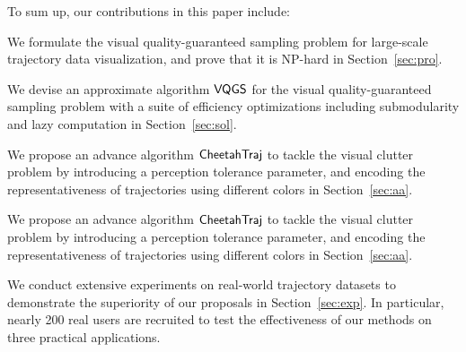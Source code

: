 To sum up, our contributions in this paper include:
\squishlist
  \item We formulate the visual quality-guaranteed sampling problem for large-scale trajectory data visualization, and prove that it is {NP-hard} in Section~\ref{sec:pro}.
  \item We devise an approximate algorithm $\mathsf{VQGS}$ for the visual quality-guaranteed sampling problem with a suite of efficiency optimizations including submodularity and lazy computation in Section~\ref{sec:sol}.
  \item We propose an advance algorithm $\mathsf{CheetahTraj}$ to tackle the visual clutter problem by introducing a perception tolerance parameter, and encoding the representativeness of trajectories using different colors in Section~\ref{sec:aa}.
  \item We propose an advance algorithm $\mathsf{CheetahTraj}$ to tackle the visual clutter problem by introducing a perception tolerance parameter, and encoding the representativeness of trajectories using different colors in Section~\ref{sec:aa}.
  \item We conduct extensive experiments on real-world trajectory datasets to demonstrate the superiority of our proposals in Section~\ref{sec:exp}. In particular, nearly 200 real users are recruited to test the effectiveness of our methods on three practical applications.
\squishend




%



